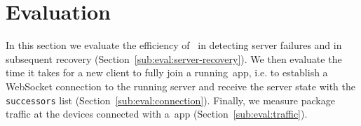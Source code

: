 \section{Evaluation}
\label{sec:evaluation}

In this section we evaluate the efficiency of ~\APIName in detecting server failures and in subsequent recovery (Section~\ref{sub:eval:server-recovery}).
We then evaluate the time it takes for a new client to fully join a running~\APIName app, i.e. to establish a WebSocket connection to the running server and receive the server state with the \texttt{successors} list (Section~\ref{sub:eval:connection}).
Finally, we measure package traffic at the devices connected with a~\APIName app (Section~\ref{sub:eval:traffic}).










